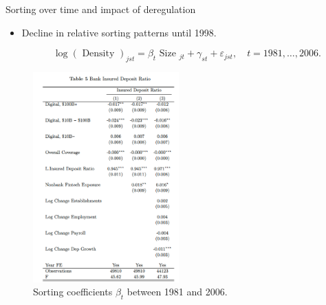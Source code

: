 \documentclass[notes,10pt, aspectratio=169]{beamer}
\begin{document}
\begin{frame}{Sorting over time and impact of deregulation}\label{sorting_time}
\begin{itemize}
\item Decline in relative sorting patterns until 1998.  %
\hyperlink{stag_time}{}

$$
\log (\text { Density })_{j s t}=\beta_t \text { Size }_{j t}+\gamma_{s t}+\varepsilon_{j s t}, \quad t=1981, \ldots, 2006 .
$$
\end{itemize}


\begin{figure}
\centering
\includegraphics[width=0.5\textwidth]{imgs/tab5.png}
\caption*{Sorting coefficients $\beta_t$ between 1981 and 2006.}
\label{fig:my_label}
\end{figure}

\end{frame}
\end{document}
